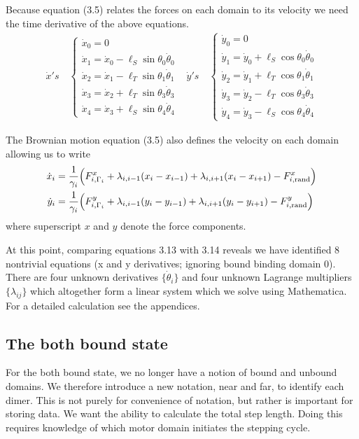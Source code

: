 		\noindent Because equation (3.5) relates the forces on each domain to its velocity we need the time derivative of the above equations. 
		\begin{align}
		\dot{x}'s \quad \begin{cases}
		\dot{x}_0 = 0 \\
		\dot{x}_1 = \dot{x}_0-\ell_S\sin\theta_0 \dot{\theta}_0 \\
		\dot{x}_2 = \dot{x}_1-\ell_T\sin\theta_1 \dot{\theta}_1 \\
		\dot{x}_3 = \dot{x}_2+\ell_T\sin\theta_3 \dot{\theta}_3 \\
		\dot{x}_4 = \dot{x}_3+\ell_S\sin\theta_4 \dot{\theta}_4
		\end{cases} &
		\dot{y}'s \quad \begin{cases}
		\dot{y}_0 = 0 \\
		\dot{y}_1 = \dot{y}_0 + \ell_S\cos\theta_0\dot{\theta}_0 \\
		\dot{y}_2 = \dot{y}_1 + \ell_T\cos\theta_1\dot{\theta}_1 \\
		\dot{y}_3 = \dot{y}_2 - \ell_T\cos\theta_3\dot{\theta}_3 \\
		\dot{y}_4 = \dot{y}_3 - \ell_S\cos\theta_4\dot{\theta}_4
		\end{cases} 
		\end{align}
		
		The Brownian motion equation (3.5) also defines the velocity on each domain allowing us to write
		\begin{align}
			\dot{x}_i &= \frac{1}{\gamma_i}\Big(F_{i,\Gamma_i}^x+ \lambda_{i,i-1}(x_i-x_{i-1})+\lambda_{i,i+1}(x_i-x_{i+1})-F_{i,\text{rand}}^x\Big)\\
			\dot{y}_i &= \frac{1}{\gamma_i}\Big(F_{i,\Gamma_i}^y+ \lambda_{i,i-1}(y_i-y_{i-1})+\lambda_{i,i+1}(y_i-y_{i+1})-F_{i,\text{rand}}^y\Big) \notag
		\end{align}
		where superscript $x$ and $y$ denote the force components. 
		
		 At this point, comparing equations 3.13 with 3.14 reveals we have identified 8 nontrivial equations (x and y derivatives; ignoring bound binding domain 0). There are four unknown derivatives $\{\dot\theta_i\}$ and four unknown Lagrange multipliers $\{\lambda_{ij}\}$ which altogether form a linear system which we solve using Mathematica. For a detailed calculation see the appendices. 
		 
		 
		\subsection{The both bound state}
		For the both bound state, we no longer have a notion of bound and unbound domains. We therefore introduce a new notation, near and far, to identify each dimer. This is not purely for convenience of notation, but rather is important for storing data. We want the ability to calculate the total step length. Doing this requires knowledge of which motor domain initiates the stepping cycle. \\
		

